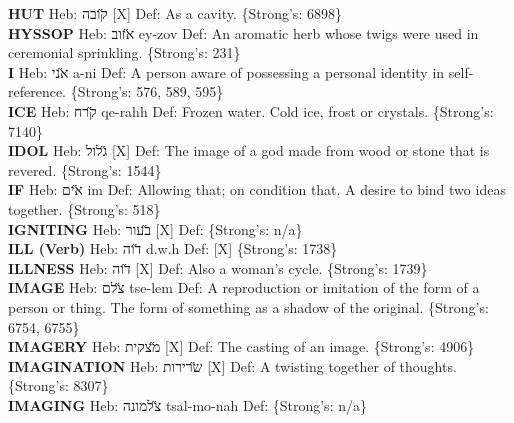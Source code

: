 {\textbf{HUT} Heb: {\large\H קובה} {[}X{]} Def: As a cavity. \{Strong's: 6898\}\hfill{}\\

\textbf{HYSSOP} Heb: {\large\H אזוב} ey-zov Def: An aromatic herb whose twigs were used in ceremonial sprinkling. \{Strong's: 231\}\hfill{}\\

\textbf{I} Heb: {\large\H אני} a-ni Def: A person aware of possessing a personal identity in self-reference. \{Strong's: 576, 589, 595\}\hfill{}\\

\textbf{ICE} Heb: {\large\H קרח} qe-rahh Def: Frozen water. Cold ice, frost or crystals. \{Strong's: 7140\}\hfill{}\\

\textbf{IDOL} Heb: {\large\H גלול} {[}X{]} Def: The image of a god made from wood or stone that is revered. \{Strong's: 1544\}\hfill{}\\

\textbf{IF} Heb: {\large\H אים} im Def: Allowing that; on condition that. A desire to bind two ideas together. \{Strong's: 518\}\hfill{}\\

\textbf{IGNITING} Heb: {\large\H בעור} {[}X{]} Def: \{Strong's: n/a\}\hfill{}\\

\textbf{ILL (Verb)} Heb: {\large\H דוה} d.w.h Def: {[}X{]} \{Strong's: 1738\}\hfill{}\\

\textbf{ILLNESS} Heb: {\large\H דוה} {[}X{]} Def: Also a woman's cycle. \{Strong's: 1739\}\hfill{}\\

\textbf{IMAGE} Heb: {\large\H צלם} tse-lem Def: A reproduction or imitation of the form of a person or thing. The form of something as a shadow of the original. \{Strong's: 6754, 6755\}\hfill{}\\

\textbf{IMAGERY} Heb: {\large\H מצקית} {[}X{]} Def: The casting of an image. \{Strong's: 4906\}\hfill{}\\

\textbf{IMAGINATION} Heb: {\large\H שרירות} {[}X{]} Def: A twisting together of thoughts. \{Strong's: 8307\}\hfill{}\\

\textbf{IMAGING} Heb: {\large\H צלמונה} tsal-mo-nah Def: \{Strong's: n/a\}\hfill{}\\

}
